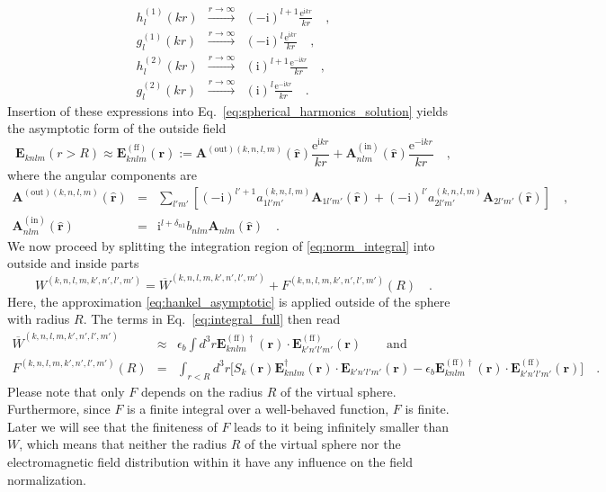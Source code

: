 \documentclass[10pt,letterpaper]{article}
\newcommand{\ii}{\text{i}}
\newcommand{\ee}{\text{e}}
\renewcommand{\vec}[1]{\mathbf{#1}}
\let\oldhat\hat
\renewcommand{\hat}[1]{\oldhat{\vec{#1}}}
\begin{document}
\begin{eqnarray}
h_l^{(1)}(kr) &\xrightarrow{r\rightarrow\infty}& (-\ii)^{l+1} \frac{\ee^{\ii kr}}{kr} \quad , \nonumber \\
g_l^{(1)}(kr) &\xrightarrow{r\rightarrow\infty}& (-\ii)^{l} \frac{\ee^{\ii kr}}{kr} \quad , \nonumber \\
h_l^{(2)}(kr) &\xrightarrow{r\rightarrow\infty}& (\ii)^{l+1} \frac{\ee^{-\ii kr}}{kr} \quad , \nonumber \\
g_l^{(2)}(kr) &\xrightarrow{r\rightarrow\infty}& (\ii)^{l} \frac{\ee^{-\ii kr}}{kr} \quad . \label{eq:hankel_asymptotic}
\end{eqnarray}
Insertion of these expressions into Eq.~\eqref{eq:spherical_harmonics_solution} yields the asymptotic form of the outside field
\begin{equation}
\vec{E}_{knlm}(r>R) \approx \vec{E}_{knlm}^{(\text{ff})}(\vec{r}):=\vec{A}^{(\text{out})(k,n,l,m)}(\hat{r})\frac{\ee^{\ii kr}}{kr}+\vec{A}_{nlm}^{(\text{in})}(\hat{r})\frac{\ee^{-\ii kr}}{kr} \quad ,
\end{equation}
where the angular components are
\begin{eqnarray}
\vec{A}^{(\text{out})(k,n,l,m)}(\hat{r}) &=& \sum_{l'm'}\left[(-\ii)^{l'+1}a_{1l'm'}^{(k,n,l,m)}\vec{A}_{1l'm'}(\hat{r})+(-\ii)^{l'}a_{2l'm'}^{(k,n,l,m)}\vec{A}_{2l'm'}(\hat{r})\right] \quad , \\
\vec{A}_{nlm}^{(\text{in})}(\hat{r}) &=& \ii^{l+\delta_{n1}}b_{nlm}\vec{A}_{nlm}(\hat{r}) \quad .
\end{eqnarray}
We now proceed by splitting the integration region of \eqref{eq:norm_integral} into outside and inside parts
\begin{equation}
W^{(k,n,l,m,k',n',l',m')} = \overline{W}^{(k,n,l,m,k',n',l',m')} + F^{(k,n,l,m,k',n',l',m')}\left(R\right) \quad . \label{eq:integral_full}
\end{equation}
Here, the approximation \eqref{eq:hankel_asymptotic} is applied outside of the sphere with radius $R$. The terms in Eq.~\eqref{eq:integral_full} then read
\begin{eqnarray}
\overline{W}^{(k,n,l,m,k',n',l',m')} &\approx& \epsilon_b\int d^3r \vec{E}_{knlm}^{(\text{ff})\dagger}(\vec{r})\cdot\vec{E}_{k'n'l'm'}^{(\text{ff})}(\vec{r}) \qquad \mathrm{and} \\
F^{(k,n,l,m,k',n',l',m')}\left(R\right) &=& \int_{r<R}d^3r\bigl[S_k(\vec{r})\vec{E}_{knlm}^{\dagger}(\vec{r})\cdot\vec{E}_{k'n'l'm'}(\vec{r}) - \epsilon_b\vec{E}_{knlm}^{(\text{ff})\dagger}(\vec{r})\cdot\vec{E}_{k'n'l'm'}^{(\text{ff})}(\vec{r})\bigr] \quad .
\end{eqnarray}
Please note that only $F$ depends on the radius $R$ of the virtual sphere. Furthermore, since $F$ is a finite integral over a well-behaved function, $F$ is finite. Later we will see that the finiteness of $F$ leads to it being infinitely smaller than $W$, which means that neither the radius $R$ of the virtual sphere nor the electromagnetic field distribution within it have any influence on the field normalization.
\end{document}
